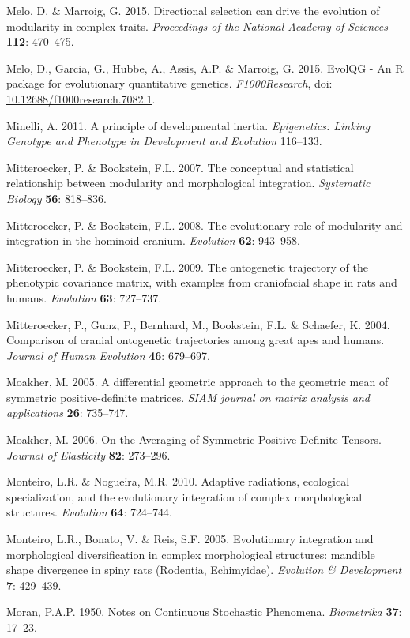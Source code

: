 \documentclass[12pt,twoside]{report}
\begin{document}
Melo, D. \& Marroig, G. 2015. Directional selection can drive the
evolution of modularity in complex traits. \emph{Proceedings of the
National Academy of Sciences} \textbf{112}: 470--475.

Melo, D., Garcia, G., Hubbe, A., Assis, A.P. \& Marroig, G. 2015. EvolQG
- An R package for evolutionary quantitative genetics.
\emph{F1000Research}, doi:
\href{http://dx.doi.org/10.12688/f1000research.7082.1}{10.12688/f1000research.7082.1}.

Minelli, A. 2011. A principle of developmental inertia.
\emph{Epigenetics: Linking Genotype and Phenotype in Development and
Evolution} 116--133.

Mitteroecker, P. \& Bookstein, F.L. 2007. The conceptual and statistical
relationship between modularity and morphological integration.
\emph{Systematic Biology} \textbf{56}: 818--836.

Mitteroecker, P. \& Bookstein, F.L. 2008. The evolutionary role of
modularity and integration in the hominoid cranium. \emph{Evolution}
\textbf{62}: 943--958.

Mitteroecker, P. \& Bookstein, F.L. 2009. The ontogenetic trajectory of
the phenotypic covariance matrix, with examples from craniofacial shape
in rats and humans. \emph{Evolution} \textbf{63}: 727--737.

Mitteroecker, P., Gunz, P., Bernhard, M., Bookstein, F.L. \& Schaefer,
K. 2004. Comparison of cranial ontogenetic trajectories among great apes
and humans. \emph{Journal of Human Evolution} \textbf{46}: 679--697.

Moakher, M. 2005. A differential geometric approach to the geometric
mean of symmetric positive-definite matrices. \emph{SIAM journal on
matrix analysis and applications} \textbf{26}: 735--747.

Moakher, M. 2006. On the Averaging of Symmetric Positive-Definite
Tensors. \emph{Journal of Elasticity} \textbf{82}: 273--296.

Monteiro, L.R. \& Nogueira, M.R. 2010. Adaptive radiations, ecological
specialization, and the evolutionary integration of complex
morphological structures. \emph{Evolution} \textbf{64}: 724--744.

Monteiro, L.R., Bonato, V. \& Reis, S.F. 2005. Evolutionary integration
and morphological diversification in complex morphological structures:
mandible shape divergence in spiny rats (Rodentia, Echimyidae).
\emph{Evolution \& Development} \textbf{7}: 429--439.

Moran, P.A.P. 1950. Notes on Continuous Stochastic Phenomena.
\emph{Biometrika} \textbf{37}: 17--23.
\end{document}
